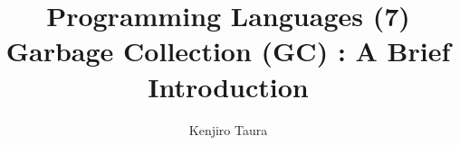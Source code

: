 \documentclass[12pt,dvipdfmx]{beamer}
\title{Programming Languages (7) \\
  Garbage Collection (GC) : A Brief Introduction}
\institute{}
\author{Kenjiro Taura}
\date{}
\newif\ifja
\newif\ifeng
\newcommand{\ao}[1]{{\color{blue}#1}}
\begin{document}
\maketitle

\begin{frame}
\ifja
\frametitle{目次}
\fi
\ifeng
\frametitle{Contents}
\fi
\tableofcontents
\end{frame}

\ifja
  \section{はじめに}
\fi
\ifeng
  \section{Introduction}
\fi
\ifja
\begin{frame}
\frametitle{ガベージコレクション(Garbage Collection; GC)}
\begin{itemize}
\item つまりは「寿命」と「アクセスする期間」が一致していないのが問題
  \begin{itemize}
  \item 寿命後でもアクセスできてしまう
  \item もうアクセスしないのに開放しない(生きっ放し)
  \end{itemize}

\item $\Rightarrow$ ガベージコレクション(GC)
  \begin{itemize}
  \item \ao{今後アクセスされ得るものは残し，され得ないものは開放(再利用)}する
  \item それを処理系が自動的に行う
  \item $\Rightarrow$ リークや，寿命後のアクセスによるメモリ破壊をなくす
  \item C, C++, 古代の言語以外はほぼ搭載している
  \end{itemize}
\item \ao{今後アクセスされ\{得る・得ない\}もの}なんてなぜわかるのでしょう?
\end{itemize}
\end{frame}
\fi
\ifeng
\end{document}
